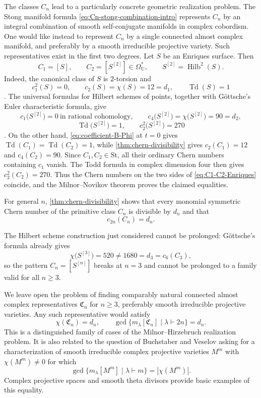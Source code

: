 \documentclass[14pt,dvipsnames]{extarticle}
\numberwithin{equation}{subsection}
\theoremstyle{plain}
\theoremstyle{definition}
\theoremstyle{definition}
\DeclareMathOperator{\Td}{Td}
\newcommand{\OmU}{\Omega_{\mathrm U}^{\ast}}
\newcommand{\St}{\mathrm{St}}
\begin{document}
The classes $C_n$ lead to a particularly concrete geometric realization
problem.  The Stong manifold formula
\eqref{eq:Cn-stong-combination-intro} represents $C_n$ by an integral combination of smooth self-conjugate
manifolds in complex cobordism.  One would like instead to
represent $C_n$ by a single connected almost complex manifold, and preferably
by a smooth irreducible projective variety.  Such representatives exist in the
first two degrees.  Let $S$ be an Enriques surface.  Then
\begin{equation}\label{eq:C1-C2-Enriques}
 C_1=[S],\qquad
 C_2=[S^{[2]}]\in\OmU,
 \qquad S^{[2]}=\operatorname{Hilb}^{2}(S).
\end{equation}
Indeed, the canonical class of $S$ is $2$-torsion and
\[
 c_1^2(S)=0,\qquad c_2(S)=\chi(S)=12=d_1,
 \qquad \Td(S)=1
\]
\cite{BHPV04}.  The universal formulas for Hilbert schemes of points,
together with G\"ottsche's Euler characteristic formula, give
\[
 c_1\bigl(S^{[2]}\bigr)=0\ \text{in rational cohomology},\qquad
 c_4\bigl(S^{[2]}\bigr)=\chi\bigl(S^{[2]}\bigr)=90=d_2,
\]
\[
 \Td\bigl(S^{[2]}\bigr)=1,\qquad
 c_2^2\bigl(S^{[2]}\bigr)=270
\]
\cite{EGL01,Got90}.  On the other hand,
\eqref{eq:coefficient-B-Phi} at $t=0$ gives
$\Td(C_1)=\Td(C_2)=1$, while \cref{thm:chern-divisibility} gives
$c_2(C_1)=12$ and $c_4(C_2)=90$.  Since $C_1,C_2\in\St$, all their ordinary Chern numbers containing
$c_1$ vanish. The Todd formula in complex dimension four then gives
$c_2^2(C_2)=270$.  Thus the Chern numbers on the two sides of
\eqref{eq:C1-C2-Enriques} coincide, and the Milnor--Novikov theorem proves the
claimed equalities.

For general $n$, \cref{thm:chern-divisibility} shows that every monomial
symmetric Chern number of the primitive class $C_n$ is divisible by $d_n$ and
that
\[
 c_{2n}(C_n)=d_n.
\]

The Hilbert scheme construction just considered cannot be prolonged:
G\"ottsche's formula already gives
\[
 \chi\bigl(S^{[3]}\bigr)=520\ne 1680=d_3=c_6(C_3),
\]
so the pattern $C_n=[S^{[n]}]$ breaks at $n=3$ and cannot be prolonged to a
family valid for all $n\geq3$.

We leave open the problem of finding comparably natural connected almost
complex representatives $\mathfrak C_n$ for $n\geq3$, preferably smooth
irreducible projective varieties.
Any such representative would satisfy
\[
 \chi(\mathfrak C_n)=d_n,
 \qquad
 \gcd\{m_\lambda[\mathfrak C_n]\mid\lambda\vdash2n\}=d_n.
\]
This is a distinguished family of cases of the Milnor--Hirzebruch realization
problem.  It is also related to the question of Buchstaber and Veselov
\cite{BV26} asking for a characterization of smooth irreducible complex
projective varieties $M^m$ with $\chi(M^m)\ne0$ for which
\[
 \gcd\{m_\lambda[M^m]\mid\lambda\vdash m\}=|\chi(M^m)|.
\]
Complex projective spaces and smooth theta divisors provide basic examples of
this equality.
\end{document}

